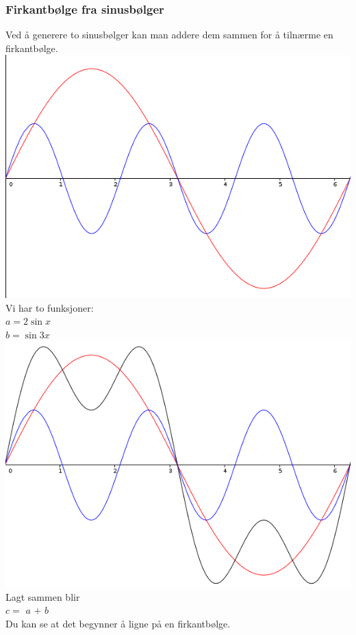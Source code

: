 \subsubsection{Firkantbølge fra sinusbølger}
Ved å generere to sinusbølger
kan man addere dem sammen for å tilnærme en firkantbølge.
\\
\includegraphics[width=\textwidth]{./img/harmoni-ab}
Vi har to funksjoner: \\
{\color{red} $a = 2\sin{x}$} \\
{\color{blue} $b = \sin{3x}$}
\\
\includegraphics[width=\textwidth]{./img/harmoni-abc}
Lagt sammen blir \\
$c = $ {\color{red} $a$} $+$ {\color{blue} $b$} \\
Du kan se at det begynner å ligne på en firkantbølge.
